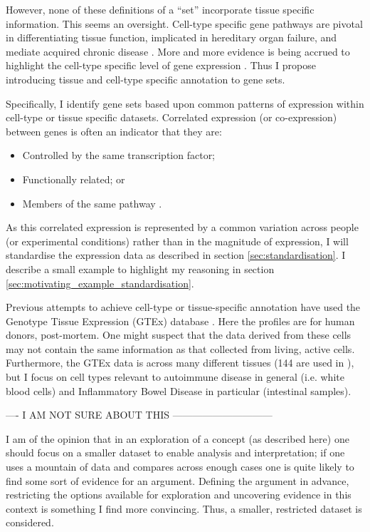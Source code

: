 \documentclass[12pt]{article} %
\begin{document}
	However, none of these definitions of a ``set'' incorporate tissue specific information. This seems an oversight. Cell-type specific gene pathways are pivotal in differentiating tissue function, implicated in hereditary organ failure, and mediate acquired chronic disease \cite{JuDefiningcelltypespecificity2013a}. More and more evidence is being accrued to highlight the cell-type specific level of gene expression \cite{GrundbergMappingcistransregulatory2012}\cite{OngEnhancerfunctionnew2011}\cite{ManiatisRegulationinducibletissuespecific1987}. Thus I propose introducing tissue and cell-type specific annotation to gene sets. 
	
	Specifically, I identify gene sets based upon common patterns of expression within cell-type or tissue specific datasets. Correlated expression (or co-expression) between genes is often an indicator that they are:
	\begin{itemize}
		\item Controlled by the same transcription factor;
		\item Functionally related; or
		\item Members of the same pathway \cite{WeirauchGeneCoexpressionNetworks2011}.
	\end{itemize}
	As this correlated expression is represented by a common variation across people (or experimental conditions) rather than in the magnitude of expression, I will standardise the expression data as described in section \ref{sec:standardisation}. I describe a small example to highlight my reasoning in section \ref{sec:motivating_example_standardisation}.
	
	Previous attempts to achieve cell-type or tissue-specific annotation have used the Genotype Tissue Expression (GTEx) \cite{GTExConsortiumGeneticeffectsgene2017} database \cite{LonsdaleGenotypeTissueExpressionGTEx2013}. Here the profiles are for human donors,
	post-mortem. One might suspect that the data derived from these cells may not contain the same information as that collected from living, active cells. Furthermore, the GTEx data is across many different tissues (144 are used in \cite{LonsdaleGenotypeTissueExpressionGTEx2013}), but I focus on cell types relevant to autoimmune disease in general (i.e. white blood cells) and Inflammatory Bowel Disease in particular (intestinal samples).
	
	---- I AM NOT SURE ABOUT THIS ------------------------------
	
	I am of the opinion that in an exploration of a concept (as described here) one should focus on a smaller dataset to enable analysis and interpretation; if one uses a mountain of data and compares across enough cases one is quite likely to find some sort of evidence for an argument. Defining the argument in advance, restricting the options available for exploration and uncovering evidence in this context is something I find more convincing. Thus, a smaller, restricted dataset is considered.
	
\end{document}
